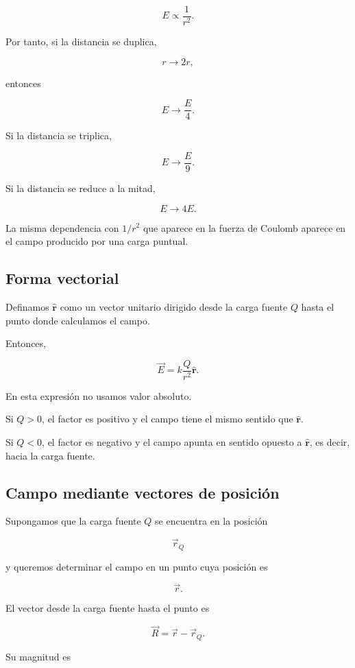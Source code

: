 \[
E\propto\frac{1}{r^2}.
\]

Por tanto, si la distancia se duplica,

\[
r\to2r,
\]

entonces

\[
\boxed{E\to\frac{E}{4}}.
\]

Si la distancia se triplica,

\[
\boxed{E\to\frac{E}{9}}.
\]

Si la distancia se reduce a la mitad,

\[
\boxed{E\to4E}.
\]

La misma dependencia con \(1/r^2\) que aparece en la fuerza de Coulomb aparece en
el campo producido por una carga puntual.


\subsection{Forma vectorial}

Definamos \(\hat{\mathbf r}\) como un vector unitario dirigido desde la carga fuente
\(Q\) hasta el punto donde calculamos el campo.

Entonces,

\begin{equation}
\boxed{\vec E=k\frac{Q}{r^2}\hat{\mathbf r}}.
\label{eq:campo_carga_puntual_vectorial}
\end{equation}

En esta expresión no usamos valor absoluto.

Si \(Q>0\), el factor es positivo y el campo tiene el mismo sentido que
\(\hat{\mathbf r}\).

Si \(Q<0\), el factor es negativo y el campo apunta en sentido opuesto a
\(\hat{\mathbf r}\), es decir, hacia la carga fuente.


\subsection{Campo mediante vectores de posición}

Supongamos que la carga fuente \(Q\) se encuentra en la posición

\[
\vec r_Q
\]

y queremos determinar el campo en un punto cuya posición es

\[
\vec r.
\]

El vector desde la carga fuente hasta el punto es

\[
\vec R=\vec r-\vec r_Q.
\]

Su magnitud es

